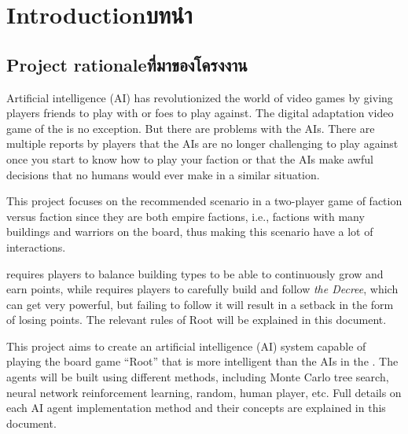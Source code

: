 \chapter{\ifenglish Introduction\else บทนำ\fi}

\section{\ifenglish Project rationale\else ที่มาของโครงงาน\fi}
Artificial intelligence (AI) has revolutionized the world of video games by giving players friends to play with or foes to play against. The digital adaptation video game of the \RootB{} is no exception. But there are problems with the AIs. There are multiple reports by \RootV{} players that the AIs are no longer challenging to play against once you start to know how to play your faction or that the AIs make awful decisions that no humans would ever make in a similar situation.

This project focuses on the recommended scenario in a two-player game of \Marquise{} faction versus \Eyrie{} faction since they are both empire factions, i.e., factions with many buildings and warriors on the board, thus making this scenario have a lot of interactions.

%
%
\Marquise{} requires players to balance building types to be able to continuously grow and earn points, while \Eyrie{} requires players to carefully build and follow \textit{the Decree}, which can get very powerful, but failing to follow it will result in a setback in the form of losing points. The relevant rules of Root will be explained in this document.
%

This project aims to create an artificial intelligence (AI) system capable of playing the board game ``Root'' that is more intelligent than the AIs in the \RootV{}. The agents will be built using different methods, including Monte Carlo tree search, neural network reinforcement learning, random, human player, etc. Full details on each AI agent implementation method and their concepts are explained in this document.



